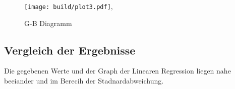 \begin{figure}
    \centering
    \texttt{[image: build/plot3.pdf]},
   \caption{G-B Diagramm}
   \label{fig:G-BL}
\end{figure}

\subsection{Vergleich der Ergebnisse}
Die gegebenen Werte und der Graph der Linearen Regression liegen nahe beeiander und im Berecih der Stadnardabweichung. 